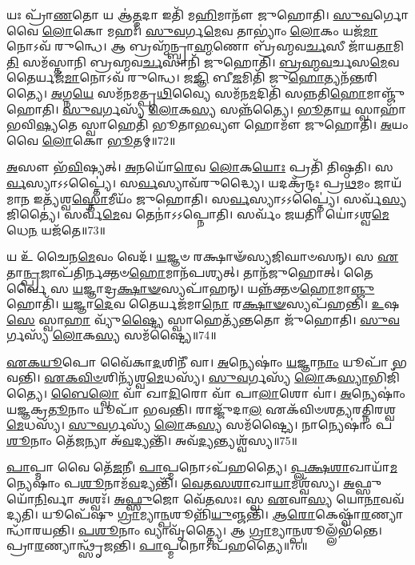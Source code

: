 𑌯𑌃 𑌪𑍍𑌰𑌾᳴\-\ul{𑌣}\-𑌤𑍋 𑌯 𑌆॑\-\ul{𑌤𑍍𑌮}\-𑌦𑌾 𑌇𑌤𑌿᳴ 𑌮\-\ul{𑌹𑌿}\-𑌮𑌾𑌨𑍗᳴ 𑌜𑍁𑌹𑍋𑌤𑌿।
\-\ul{𑌸𑍁}\-\-\ul{𑌵}\-𑌰𑍍𑌗𑍋 𑌵𑍈 \ul{𑌲𑍋}\-𑌕𑍋 𑌮𑌹𑌃᳴।
\-\ul{𑌸𑍁}\-\-\ul{𑌵}\-𑌰𑍍𑌗\-\ul{𑌮𑍇}\-𑌵 𑌤𑌾𑌭𑍍𑌯𑌾𑌂॑ \ul{𑌲𑍋}\-𑌕𑌂 𑌯𑌜᳴\-\ul{𑌮𑌾}\-𑌨𑍋𑌽𑌵᳴ 𑌰𑍁𑌨𑍍𑌧𑍇।
𑌆 𑌬𑍍𑌰𑌹𑍍𑌮᳴𑌨𑍍𑌬𑍍𑌰𑌾\-\ul{𑌹𑍍𑌮}\-𑌣𑍋 𑌬𑍍𑌰᳴𑌹𑍍𑌮𑌵\-\ul{𑌰𑍍𑌚}\-𑌸𑍀 𑌜𑌾᳴𑌯\-\ul{𑌤𑌾}\-𑌮𑌿\-\ul{𑌤𑌿} 𑌸𑌮᳴𑌸𑍍𑌤𑌾𑌨𑌿 𑌬𑍍𑌰𑌹𑍍𑌮𑌵\-\ul{𑌰𑍍𑌚}\-𑌸𑌾𑌨𑌿᳴ 𑌜𑍁𑌹𑍋𑌤𑌿।
\-\ul{𑌬𑍍𑌰}\-\-\ul{𑌹𑍍𑌮}\-\-\ul{𑌵}\-𑌰𑍍𑌚𑌸\-\ul{𑌮𑍇}\-𑌵 𑌤𑍈𑌰𑍍𑌯𑌜᳴\-\ul{𑌮𑌾}\-𑌨𑍋𑌽𑌵᳴ 𑌰𑍁𑌨𑍍𑌧𑍇।
𑌜\-\ul{𑌜𑍍𑌞𑌿} 𑌬𑍀\-\ul{𑌜}\-𑌮𑌿𑌤𑌿᳴ 𑌜𑍁\-\ul{𑌹𑍋}\-𑌤𑍍𑌯𑌨᳴𑌨𑍍𑌤𑌰𑌿𑌤𑍍𑌯𑍈।
\-\ul{𑌅}\-𑌗𑍍𑌨\-\ul{𑌯𑍇} 𑌸𑌮᳴𑌨𑌮𑌤𑍍𑌪𑍃\-\ul{𑌥𑌿}\-𑌵𑍍𑌯𑍈 𑌸𑌮᳴𑌨\-\ul{𑌮}\-𑌦𑌿𑌤𑌿᳴ 𑌸𑌨𑍍𑌨𑌤𑌿\-\ul{𑌹𑍋}\-𑌮𑌾𑌞𑍍𑌜𑍁᳴𑌹𑍋𑌤𑌿।
\-\ul{𑌸𑍁}\-\-\ul{𑌵}\-𑌰𑍍𑌗𑌸𑍍𑌯᳴ \ul{𑌲𑍋}\-𑌕\-\ul{𑌸𑍍𑌯} 𑌸𑌨𑍍𑌨᳴𑌤𑍍𑌯𑍈।
\-\ul{𑌭𑍂}\-𑌤𑌾\-\ul{𑌯} 𑌸𑍍𑌵𑌾𑌹𑌾᳴ 𑌭𑌵𑌿\-\ul{𑌷𑍍𑌯}\-𑌤𑍇 𑌸𑍍𑌵𑌾𑌹𑍇𑌤𑌿᳴ 𑌭𑍂𑌤𑌾\-\ul{𑌭}\-𑌵𑍍𑌯𑍗 𑌹𑍋𑌮𑍗᳴ 𑌜𑍁𑌹𑍋𑌤𑌿।
\-\ul{𑌅}\-𑌯𑌂 𑌵𑍈 \ul{𑌲𑍋}\-𑌕𑍋 \ul{𑌭𑍂}\-𑌤𑌮𑍍॥72॥

\-\ul{𑌅}\-𑌸𑍗 𑌭᳴\-\ul{𑌵𑌿}\-𑌷𑍍𑌯𑌤𑍍।
\-\ul{𑌅}\-𑌨𑌯𑍋᳴\-\ul{𑌰𑍇}\-𑌵 \ul{𑌲𑍋}\-𑌕\-\ul{𑌯𑍋𑌃} 𑌪𑍍𑌰𑌤𑌿᳴ 𑌤𑌿𑌷𑍍𑌠𑌤𑌿।
𑌸\-\ul{𑌰𑍍𑌵}\-𑌸𑍍𑌯𑌾𑌽𑌽𑌪𑍍𑌤𑍍𑌯𑍈॑।
𑌸\-\ul{𑌰𑍍𑌵}\-𑌸𑍍𑌯𑌾𑌵᳴𑌰𑍁𑌦𑍍𑌧𑍍𑌯𑍈।
𑌯𑌦𑌕𑍍𑌰᳴𑌨𑍍𑌦𑌃 𑌪𑍍𑌰\-\ul{𑌥}\-𑌮𑌂 𑌜𑌾𑌯᳴𑌮𑌾\-\ul{𑌨} 𑌇𑌤𑍍𑌯᳴𑌶𑍍𑌵\-\ul{𑌸𑍍𑌤𑍋}\-𑌮𑍀𑌯𑌂᳴ 𑌜𑍁𑌹𑍋𑌤𑌿।
𑌸\-\ul{𑌰𑍍𑌵}\-𑌸𑍍𑌯𑌾𑌽𑌽𑌪𑍍𑌤𑍍𑌯𑍈॑।
𑌸𑌰𑍍𑌵᳴\-\ul{𑌸𑍍𑌯} 𑌜𑌿𑌤𑍍𑌯𑍈॑।
𑌸𑌰𑍍𑌵᳴\-\ul{𑌮𑍇}\-𑌵 𑌤𑍇𑌨𑌾॑𑌽𑌽𑌪𑍍𑌨𑍋𑌤𑌿।
𑌸𑌰𑍍𑌵𑌂᳴ 𑌜𑌯𑌤𑌿।
𑌯𑍋॑𑌽𑌶𑍍𑌵\-\ul{𑌮𑍇}\-𑌧𑍇\-\ul{𑌨} 𑌯𑌜᳴𑌤𑍇॥73॥

𑌯 𑌉᳴ 𑌚𑍈𑌨\-\ul{𑌮𑍇}\-𑌵𑌂 𑌵𑍇𑌦᳴।
\-\ul{𑌯}\-𑌜𑍍𑌞𑍞 𑌰𑌕𑍍𑌷𑌾𑍟᳴𑌸𑍍𑌯𑌜𑌿𑌘𑌾𑍞𑌸𑌨𑍍।
𑌸 \ul{𑌏}\-𑌤𑌾\-\ul{𑌨𑍍𑌪𑍍𑌰}\-𑌜𑌾𑌪᳴𑌤𑌿𑌰𑍍𑌨𑌕𑍍𑌤𑍞\-\ul{𑌹𑍋}\-𑌮𑌾𑌨᳴𑌪𑌶𑍍𑌯𑌤𑍍।
𑌤𑌾𑌨᳴𑌜𑍁𑌹𑍋𑌤𑍍।
𑌤𑍈𑌰𑍍𑌵𑍈 𑌸 \ul{𑌯}\-𑌜𑍍𑌞𑌾𑌦𑍍𑌰\-\ul{𑌕𑍍𑌷𑌾}\-\-\ul{𑍟}\-𑌸𑍍𑌯𑌪𑌾᳴𑌹𑌨𑍍।
𑌯𑌨𑍍𑌨᳴𑌕𑍍𑌤𑍞\-\ul{𑌹𑍋}\-𑌮𑌾\-\ul{𑌞𑍍𑌜𑍁}\-𑌹𑍋𑌤𑌿᳴।
\-\ul{𑌯}\-𑌜𑍍𑌞𑌾\-\ul{𑌦𑍇}\-𑌵 𑌤𑍈𑌰𑍍𑌯𑌜᳴𑌮𑌾\-\ul{𑌨𑍋} 𑌰\-\ul{𑌕𑍍𑌷𑌾}\-\-\ul{𑍟}\-𑌸𑍍𑌯𑌪᳴𑌹𑌨𑍍𑌤𑌿।
\-\ul{𑌉}\-𑌷\-\ul{𑌸𑍇} 𑌸𑍍𑌵𑌾\-\ul{𑌹𑌾} 𑌵𑍍𑌯𑍁᳴\-\ul{𑌷𑍍𑌟𑍍𑌯𑍈} 𑌸𑍍𑌵𑌾𑌹𑍇𑌤𑍍𑌯᳴\-\ul{𑌨𑍍𑌤}\-𑌤𑍋 𑌜𑍁᳴𑌹𑍋𑌤𑌿।
\-\ul{𑌸𑍁}\-\-\ul{𑌵}\-𑌰𑍍𑌗𑌸𑍍𑌯᳴ \ul{𑌲𑍋}\-𑌕\-\ul{𑌸𑍍𑌯} 𑌸𑌮᳴𑌷𑍍𑌟𑍍𑌯𑍈॥74॥\anuvakamend[𑌵𑍈 𑌨𑌭𑌾𑍞᳴\-\ul{𑌸𑌿} 𑌸𑍂\-\ul{𑌰𑍍𑌯𑍋} 𑌜𑍍𑌯𑍋\-\ul{𑌤𑌿𑌃} 𑌸𑌨𑍍𑌤᳴\-\ul{𑌤𑍍𑌯𑍈} 𑌸𑌮᳴𑌷𑍍𑌟𑍍𑌯𑍈 \ul{𑌭𑍂}\-𑌤𑌂 𑌯𑌜᳴\-\ul{𑌤𑍇} 𑌨𑌵᳴ 𑌚]

\-\ul{𑌏}\-\-\ul{𑌕}\-\-\ul{𑌯𑍂}\-𑌪𑍋 𑌵𑍈᳴𑌕𑌾\-\ul{𑌦}\-𑌶𑌿𑌨𑍀᳴ 𑌵𑌾।
\-\ul{𑌅}\-𑌨𑍍𑌯𑍇𑌷𑌾𑌂॑ \ul{𑌯}\-𑌜𑍍𑌞𑌾\-\ul{𑌨𑌾𑌂} 𑌯𑍂𑌪𑌾᳴ 𑌭𑌵𑌨𑍍𑌤𑌿।
\-\ul{𑌏}\-\-\ul{𑌕}\-\-\ul{𑌵𑌿}\-\-\ul{𑍞}\-𑌶𑌿𑌨𑍍𑌯᳴𑌶𑍍𑌵\-\ul{𑌮𑍇}\-𑌧𑌸𑍍𑌯᳴।
\-\ul{𑌸𑍁}\-\-\ul{𑌵}\-𑌰𑍍𑌗𑌸𑍍𑌯᳴ \ul{𑌲𑍋}\-𑌕\-\ul{𑌸𑍍𑌯𑌾}\-𑌭𑌿𑌜𑌿᳴𑌤𑍍𑌯𑍈।
\-\ul{𑌬𑍈}\-\-\ul{𑌲𑍍}\-𑌵𑍋 𑌵𑌾᳴ 𑌖𑌾\-\ul{𑌦𑌿}\-𑌰𑍋 𑌵𑌾᳴ 𑌪𑌾\-\ul{𑌲𑌾}\-𑌶𑍋 𑌵𑌾॑।
\-\ul{𑌅}\-𑌨𑍍𑌯𑍇𑌷𑌾𑌂॑ 𑌯𑌜𑍍𑌞𑌕𑍍𑌰\-\ul{𑌤𑍂}\-𑌨𑌾𑌂 𑌯𑍂𑌪𑌾᳴ 𑌭𑌵𑌨𑍍𑌤𑌿।
𑌰𑌾𑌜𑍍𑌜𑍁᳴𑌦𑌾\-\ul{𑌲} 𑌏𑌕᳴𑌵𑌿𑍞𑌶𑌤𑍍𑌯𑌰𑌤𑍍𑌨𑌿𑌰𑌶𑍍𑌵\-\ul{𑌮𑍇}\-𑌧𑌸𑍍𑌯᳴।
\-\ul{𑌸𑍁}\-\-\ul{𑌵}\-𑌰𑍍𑌗𑌸𑍍𑌯᳴ \ul{𑌲𑍋}\-𑌕\-\ul{𑌸𑍍𑌯} 𑌸𑌮᳴𑌷𑍍𑌟𑍍𑌯𑍈।
𑌨𑌾𑌨𑍍𑌯𑍇𑌷𑌾𑌂॑ 𑌪\-\ul{𑌶𑍂}\-𑌨𑌾𑌂 𑌤𑍇᳴\-\ul{𑌜}\-𑌨𑍍𑌯𑌾 𑌅᳴\-\ul{𑌵}\-𑌦𑍍𑌯𑌨𑍍𑌤𑌿᳴।
𑌅𑌵᳴\-\ul{𑌦𑍍𑌯}\-𑌨𑍍𑌤𑍍𑌯𑌶𑍍𑌵᳴𑌸𑍍𑌯॥75॥

\-\ul{𑌪𑌾}\-𑌪𑍍𑌮𑌾 𑌵𑍈 𑌤𑍇᳴\-\ul{𑌜}\-𑌨𑍀।
\-\ul{𑌪𑌾}\-𑌪𑍍𑌮𑌨𑍋\-𑌽𑌪᳴𑌹𑌤𑍍𑌯𑍈।
\-\ul{𑌪𑍍𑌲}\-\-\ul{𑌕𑍍𑌷}\-\-\ul{𑌶𑌾}\-𑌖𑌾𑌯𑌾᳴\-\ul{𑌮}\-𑌨𑍍𑌯𑍇𑌷𑌾𑌂॑ 𑌪\-\ul{𑌶𑍂}\-𑌨𑌾𑌮᳴\-\ul{𑌵}\-𑌦𑍍𑌯𑌨𑍍𑌤𑌿᳴।
\-\ul{𑌵𑍇}\-\-\ul{𑌤}\-\-\ul{𑌸}\-\-\ul{𑌶𑌾}\-𑌖𑌾\-\ul{𑌯𑌾}\-𑌮𑌶𑍍𑌵᳴𑌸𑍍𑌯।
\-\ul{𑌅}\-𑌫𑍍𑌸𑍁𑌯𑍋᳴\-\ul{𑌨𑌿}\-𑌰𑍍𑌵𑌾 𑌅𑌶𑍍𑌵𑌃᳴।
\-\ul{𑌅}\-\-\ul{𑌫𑍍𑌸𑍁}\-𑌜𑍋 𑌵𑍇᳴\-\ul{𑌤}\-𑌸𑌃।
𑌸𑍍𑌵 \ul{𑌏}\-𑌵𑌾\-\ul{𑌸𑍍𑌯} 𑌯𑍋\-\ul{𑌨𑌾}\-𑌵𑌵᳴ 𑌦𑍍𑌯𑌤𑌿।
𑌯𑍂𑌪𑍇᳴𑌷𑍁 \ul{𑌗𑍍𑌰𑌾}\-𑌮𑍍𑌯𑌾\-\ul{𑌨𑍍𑌪}\-𑌶𑍂𑌨𑍍𑌨𑌿᳴\-\ul{𑌯𑍁}\-𑌞𑍍𑌜𑌨𑍍𑌤𑌿᳴।
\-\ul{𑌆}\-\-\ul{𑌰𑍋}\-𑌕𑍇𑌷𑍍𑌵𑌾᳴\-\ul{𑌰}\-𑌣𑍍𑌯𑌾𑌨𑍍𑌧𑌾᳴𑌰𑌯𑌨𑍍𑌤𑌿।
\-\ul{𑌪}\-\-\ul{𑌶𑍂}\-𑌨𑌾𑌂 𑌵𑍍𑌯𑌾𑌵𑍃᳴𑌤𑍍𑌤𑍍𑌯𑍈।
𑌆 \ul{𑌗𑍍𑌰𑌾}\-𑌮𑍍𑌯𑌾\-\ul{𑌨𑍍𑌪}\-𑌶𑍂𑌲𑍍𑌲𑌁𑌭᳴𑌨𑍍𑌤𑍇।
𑌪𑍍𑌰𑌾\-\ul{𑌰}\-𑌣𑍍𑌯𑌾𑌨𑍍𑌥𑍍𑌸𑍃᳴𑌜𑌨𑍍𑌤𑌿।
\-\ul{𑌪𑌾}\-𑌪𑍍𑌮𑌨𑍋\-𑌽𑌪᳴𑌹𑌤𑍍𑌯𑍈॥76॥\anuvakamend[𑌅𑌶𑍍𑌵᳴\-\ul{𑌸𑍍𑌯} 𑌵𑍍𑌯𑌾𑌵𑍃᳴\-\ul{𑌤𑍍𑌤𑍍𑌯𑍈} 𑌤𑍍𑌰𑍀𑌣𑌿᳴ 𑌚]

